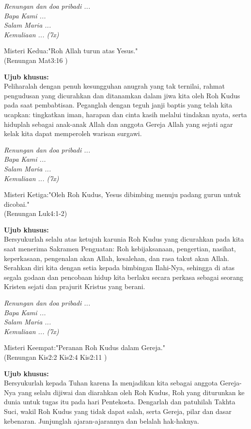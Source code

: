 {\it Renungan dan doa pribadi ...\\
Bapa Kami ...\\
Salam Maria ...\\
Kemuliaan ... (7x)}

Misteri Kedua:"Roh Allah turun atas Yesus."\\
(Renungan Mat3:16 )

{\bf Ujub khusus:}\\
Peliharalah dengan penuh kesungguhan anugrah yang tak ternilai, rahmat pengudusan yang dicurahkan dan ditanamkan dalam jiwa kita oleh Roh Kudus pada saat pembabtisan. Peganglah dengan teguh janji baptis yang telah kita ucapkan: tingkatkan iman, harapan dan cinta kasih melalui tindakan nyata, serta hiduplah sebagai anak-anak Allah dan anggota Gereja Allah yang sejati agar kelak kita dapat memperoleh warisan surgawi.

{\it Renungan dan doa pribadi ...\\
Bapa Kami ...\\
Salam Maria ...\\
Kemuliaan ... (7x)}

Misteri Ketiga:"Oleh Roh Kudus, Yesus dibimbing menuju padang gurun untuk dicobai."\\
(Renungan Luk4:1-2)

{\bf Ujub khusus:}\\
Bersyukurlah selalu atas ketujuh karunia Roh Kudus yang dicurahkan pada kita saat menerima Sakramen Penguatan: Roh kebijaksanaan, pengertian, nasihat, keperkasaan, pengenalan akan Allah, kesalehan, dan rasa takut akan Allah. Serahkan diri kita dengan setia kepada bimbingan Ilahi-Nya, sehingga di atas segala godaan dan pencobaan hidup kita berlaku secara perkasa sebagai seorang Kristen sejati dan prajurit Kristus yang berani.

{\it Renungan dan doa pribadi ...\\
Bapa Kami ...\\
Salam Maria ...\\
Kemuliaan ... (7x)}

Misteri Keempat:"Peranan Roh Kudus dalam Gereja."\\
(Renungan Kis2:2 Kis2:4 Kis2:11 )

{\bf Ujub khusus:}\\
Bersyukurlah kepada Tuhan karena Ia menjadikan kita sebagai anggota Gereja-Nya yang selalu dijiwai dan diarahkan oleh Roh Kudus, Roh yang diturunkan ke dunia untuk tugas itu pada hari Pentekosta. Dengarlah dan patuhilah Takhta Suci, wakil Roh Kudus yang tidak dapat salah, serta Gereja, pilar dan dasar kebenaran. Junjunglah ajaran-ajarannya dan belalah hak-haknya.

